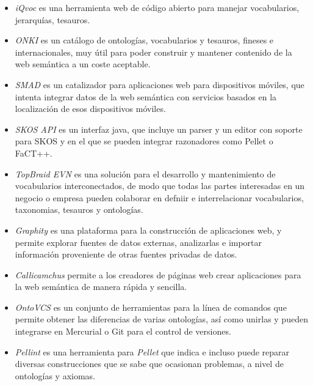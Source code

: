     	\begin{itemize}
		\item \textit{iQvoc} es una herramienta web de código abierto para manejar vocabularios, jerarquías, tesauros.
			
		\item \textit{ONKI} es un catálogo de ontologías, vocabularios y tesauros, fineses e internacionales, muy útil para poder construir y mantener contenido de la web semántica a un coste aceptable. 

		\item \textit{SMAD} es un catalizador para aplicaciones web para dispositivos móviles, que intenta integrar datos de la web semántica con servicios basados en la localización de esos dispositivos móviles.

		\item \textit{SKOS API} es un interfaz java, que incluye un parser y un editor con soporte para SKOS y en el que se pueden integrar razonadores como Pellet o FaCT++.

		\item \textit{TopBraid EVN} es una solución para el desarrollo y mantenimiento de vocabularios interconectados, de modo que todas las partes interesadas en un negocio o empresa pueden colaborar en defniir e interrelacionar vocabularios, taxonomias, tesauros y ontologías.

		\item \textit{Graphity} es una plataforma para la construcción de aplicaciones web, y permite explorar fuentes de datos externas, analizarlas e importar información proveniente de otras fuentes privadas de datos.

		\item \textit {Callicamchus} permite a los creadores de páginas web crear aplicaciones para la web semántica de manera rápida y sencilla.

		\item \textit{OntoVCS} es un conjunto de herramientas para la línea de comandos que permite obtener las diferencias de varias ontologías, así como unirlas y pueden integrarse en Mercurial o Git para el control de versiones.

		\item \textit{Pellint} es una herramienta para \textit{Pellet} que indica e incluso puede reparar diversas construcciones que se sabe que ocasionan problemas, a nivel de ontologías y axiomas.


\end{itemize}
